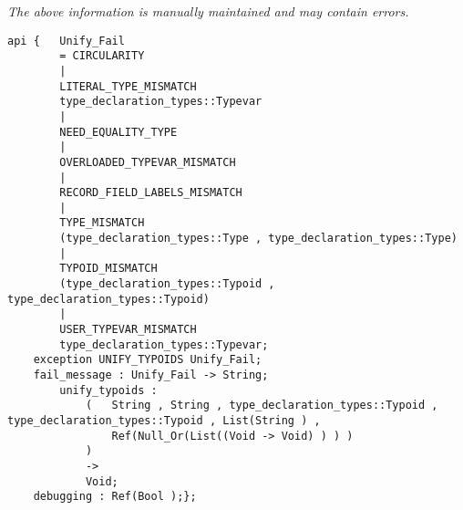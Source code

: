 \label{api:Unify\_Typoids}

{\tiny \it The above information is manually maintained and may contain errors.}
\begin{verbatim}
api {   Unify_Fail
        = CIRCULARITY
        |
        LITERAL_TYPE_MISMATCH
        type_declaration_types::Typevar
        |
        NEED_EQUALITY_TYPE
        |
        OVERLOADED_TYPEVAR_MISMATCH
        |
        RECORD_FIELD_LABELS_MISMATCH
        |
        TYPE_MISMATCH
        (type_declaration_types::Type , type_declaration_types::Type)
        |
        TYPOID_MISMATCH
        (type_declaration_types::Typoid , type_declaration_types::Typoid)
        |
        USER_TYPEVAR_MISMATCH
        type_declaration_types::Typevar;
    exception UNIFY_TYPOIDS Unify_Fail;
    fail_message : Unify_Fail -> String;
        unify_typoids :
            (   String , String , type_declaration_types::Typoid , type_declaration_types::Typoid , List(String ) ,
                Ref(Null_Or(List((Void -> Void) ) ) )
            )
            ->
            Void;
    debugging : Ref(Bool );};
\end{verbatim}
